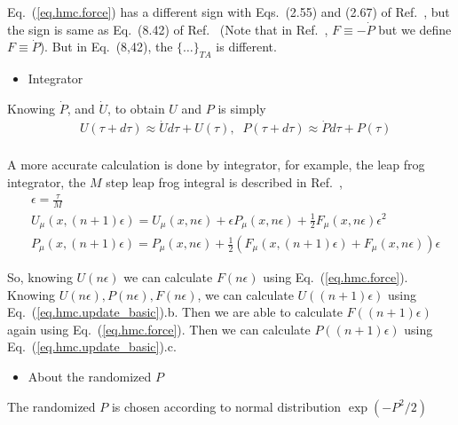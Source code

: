 Eq.~(\ref{eq.hmc.force}) has a different sign with Eqs.~(2.55) and (2.67) of Ref.~\cite{latticeqcdbook2017}, but the sign is same as Eq.~(8.42) of Ref.~\cite{latticeqcdbook2010} (Note that in Ref.~\cite{latticeqcdbook2010}, $F\equiv -\dot{P}$ but we define $F\equiv \dot{P}$). But in Eq.~(8,42), the $\{\ldots\}_{TA}$ is different.

\begin{itemize}
\item {}Integrator
\end{itemize}

Knowing $\dot{P}$, and $\dot {U}$, to obtain $U$ and $P$ is simply
\begin{equation}
\begin{split}
&U(\tau+d\tau)\approx \dot{U}d\tau + U(\tau),\;\;P(\tau+d\tau)\approx \dot{P}d\tau + P(\tau)\\
\end{split}
\end{equation}

A more accurate calculation is done by integrator, for example, the leap frog integrator, the $M$ step leap frog integral is described in Ref.~\cite{latticeqcdbook2010},
\begin{subequations}
\begin{eqnarray}
&\epsilon = \frac{\tau}{M}\\
&U_{\mu}(x,(n+1)\epsilon)=U_{\mu}(x,n\epsilon)+\epsilon P_{\mu}(x,n\epsilon)+\frac{1}{2}F_{\mu}(x,n\epsilon)\epsilon ^2\\
&P_{\mu}(x,(n+1)\epsilon)=P_{\mu}(x,n\epsilon)+\frac{1}{2}\left(F_{\mu}(x,(n+1)\epsilon)+F_{\mu}(x,n\epsilon)\right)\epsilon
\end{eqnarray}
\label{eq.hmc.update_basic}
\end{subequations}

So, knowing $U(n\epsilon)$ we can calculate $F(n\epsilon)$ using Eq.~(\ref{eq.hmc.force}).
Knowing $U(n\epsilon),P(n\epsilon),F(n\epsilon)$, we can calculate $U((n+1)\epsilon)$ using Eq.~(\ref{eq.hmc.update_basic}).b.
Then we are able to calculate $F((n+1)\epsilon)$ again using Eq.~(\ref{eq.hmc.force}).
Then we can calculate $P((n+1)\epsilon)$ using Eq.~(\ref{eq.hmc.update_basic}).c.

\begin{itemize}
  \item About the randomized $P$
\end{itemize}

The randomized $P$ is chosen according to normal distribution $\exp \left(-P^2 /2\right)$ 

